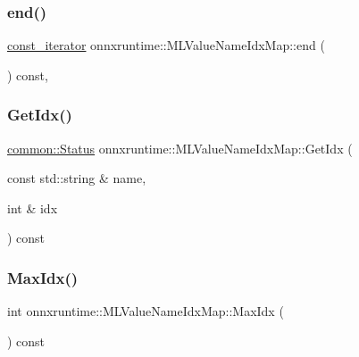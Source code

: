 \subsubsection{\texorpdfstring{end()}{end()}}
{\footnotesize\ttfamily \mbox{\hyperlink{classonnxruntime_1_1MLValueNameIdxMap_a1958c1e7ae1abe65e658008c626f99cf}{const\+\_\+iterator}} onnxruntime\+::\+M\+L\+Value\+Name\+Idx\+Map\+::end (\begin{DoxyParamCaption}{ }\end{DoxyParamCaption}) const\hspace{0.3cm}{\ttfamily [inline]}, {\ttfamily [noexcept]}}

\mbox{\label{classonnxruntime_1_1MLValueNameIdxMap_a9f6ce23655823acce1d71a987c5e5e9a}} 
\subsubsection{\texorpdfstring{Get\+Idx()}{GetIdx()}}
{\footnotesize\ttfamily \mbox{\hyperlink{classonnxruntime_1_1common_1_1Status}{common\+::\+Status}} onnxruntime\+::\+M\+L\+Value\+Name\+Idx\+Map\+::\+Get\+Idx (\begin{DoxyParamCaption}\item[{const std\+::string \&}]{name,  }\item[{int \&}]{idx }\end{DoxyParamCaption}) const\hspace{0.3cm}{\ttfamily [inline]}}

\mbox{\label{classonnxruntime_1_1MLValueNameIdxMap_a8789325a741d5cc81f0fee4604cac188}} 
\subsubsection{\texorpdfstring{Max\+Idx()}{MaxIdx()}}
{\footnotesize\ttfamily int onnxruntime\+::\+M\+L\+Value\+Name\+Idx\+Map\+::\+Max\+Idx (\begin{DoxyParamCaption}{ }\end{DoxyParamCaption}) const\hspace{0.3cm}{\ttfamily [inline]}}

